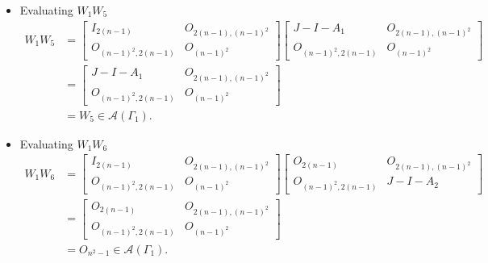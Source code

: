 \begin{itemize}
    \item Evaluating $W_1W_5$
    \begin{align*}
        W_1W_5
        &= \begin{bmatrix}
            I_{2(n-1)} & O_{2(n-1), (n-1)^2} \\
            O_{(n-1)^2, 2(n-1)} & O_{(n-1)^2}
        \end{bmatrix}\begin{bmatrix}
            J-I-A_1 & O_{2(n-1), (n-1)^2} \\
            O_{(n-1)^2, 2(n-1)} & O_{(n-1)^2}
        \end{bmatrix} \\
        &= \begin{bmatrix}
            J-I-A_1 & O_{2(n-1), (n-1)^2} \\
            O_{(n-1)^2, 2(n-1)} & O_{(n-1)^2}
        \end{bmatrix} \\
        &= W_5 \in\mathcal{A}(\Gamma_1).
    \end{align*}
    
    \item Evaluating $W_1W_6$
    \begin{align*}
        W_1W_6
        &= \begin{bmatrix}
            I_{2(n-1)} & O_{2(n-1), (n-1)^2} \\
            O_{(n-1)^2, 2(n-1)} & O_{(n-1)^2}
        \end{bmatrix}\begin{bmatrix}
            O_{2(n-1)} & O_{2(n-1), (n-1)^2} \\
            O_{(n-1)^2, 2(n-1)} & J-I-A_2
        \end{bmatrix}\\
        &= \begin{bmatrix}
            O_{2(n-1)} & O_{2(n-1), (n-1)^2} \\
            O_{(n-1)^2, 2(n-1)} & O_{(n-1)^2}
        \end{bmatrix}\\
        &= O_{n^2-1} \in \mathcal{A}(\Gamma_1).
    \end{align*}
    

\end{itemize}
